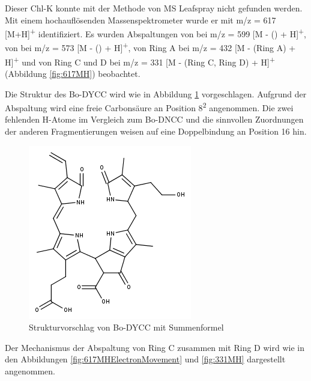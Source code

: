 Dieser \gls{Chl-K} konnte mit der Methode von MS Leafspray nicht gefunden werden. Mit einem hochauflösenden Massenspektrometer wurde er mit m/z = 617 [M+H]\textsuperscript{+} identifiziert. Es wurden Abspaltungen von  bei m/z = 599 [M - () + H]\textsuperscript{+}, von  bei m/z = 573 [M - () + H]\textsuperscript{+}, von Ring A bei m/z = 432 [M - (Ring A) + H]\textsuperscript{+} und von Ring C und D bei m/z = 331 [M - (Ring C, Ring D) + H]\textsuperscript{+} (Abbildung \ref{fig:617MH}) beobachtet.

Die Struktur des Bo-DYCC  wird wie in Abbildung \ref{fig:617MHStruktur} vorgeschlagen. Aufgrund der  Abspaltung wird eine freie Carbonsäure an Position 8\textsuperscript{2} angenommen. Die zwei fehlenden H-Atome im Vergleich zum Bo-DNCC und die sinnvollen Zuordnungen der anderen Fragmentierungen weisen auf eine Doppelbindung an Position 16 hin.  

\begin{figure}[!htbp]
  \centering
  \includegraphics[scale=0.6]{figures/Kapitel7/Kataboliten/fragmentation_structures/VWA_Katabolit_617.png}
  \caption[Strukturvorschlag von Bo-DYCC, Quelle: Autor]{Strukturvorschlag von Bo-DYCC mit Summenformel }
  \label{fig:617MHStruktur}
\end{figure}

Der Mechanismus der Abspaltung von Ring C zusammen mit Ring D wird wie in den Abbildungen \ref{fig:617MHElectronMovement} und \ref{fig:331MH} dargestellt angenommen. 

